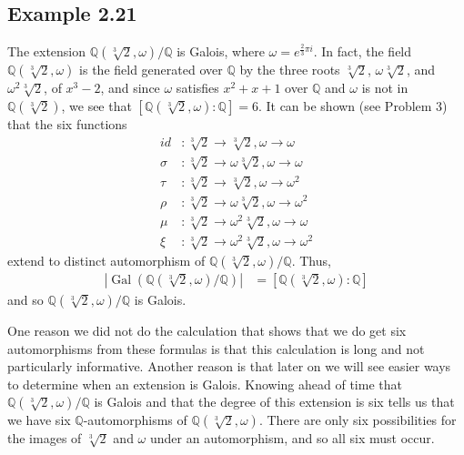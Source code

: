 \documentclass[fleqn]{article}
\DeclareMathOperator{\Gal}{Gal}
\begin{document}
        \subsection{Example 2.21}
        The extension $\mathbb{Q}\left(\sqrt[3]{2}, \omega\right)/\mathbb{Q}$ is Galois, where $\omega = e^{\frac{2}{3} \pi i}$.  In fact, the field $\mathbb{Q}\left(\sqrt[3]{2}, \omega\right)$ is the field generated over $\mathbb{Q}$ by the three roots $\sqrt[3]{2}$, $\omega \sqrt[3]{2}$, and $\omega^2 \sqrt[3]{2}$, of $x^3 - 2$, and since $\omega$ satisfies $x^2 + x + 1$ over $\mathbb{Q}$ and $\omega$ is not in $\mathbb{Q}\left(\sqrt[3]{2}\right)$, we see that $\left[\mathbb{Q}\left(\sqrt[3]{2}, \omega\right) : \mathbb{Q}\right] = 6$.  It can be shown (see Problem 3) that the six functions
        \begin{align}
            id &: \sqrt[3]{2} \to \sqrt[3]{2}, \omega \to \omega \\
            \sigma &: \sqrt[3]{2} \to \omega \sqrt[3]{2}, \omega \to \omega \\
            \tau &: \sqrt[3]{2} \to \sqrt[3]{2}, \omega \to \omega^2 \\
            \rho &: \sqrt[3]{2} \to \omega \sqrt[3]{2}, \omega \to \omega^2 \\
            \mu &: \sqrt[3]{2} \to \omega^2 \sqrt[3]{2}, \omega \to \omega \\
            \xi &: \sqrt[3]{2} \to \omega^2 \sqrt[3]{2}, \omega \to \omega^2
        \end{align}
        extend to distinct automorphism of $\mathbb{Q}\left(\sqrt[3]{2}, \omega\right)/\mathbb{Q}$.  Thus, 
        \begin{align}
            \left|\Gal\left(\mathbb{Q}\left(\sqrt[3]{2}, \omega\right)/\mathbb{Q}\right)\right| &= \left[\mathbb{Q}\left(\sqrt[3]{2}, \omega\right) : \mathbb{Q}\right]
        \end{align}
        and so $\mathbb{Q}\left(\sqrt[3]{2}, \omega\right)/\mathbb{Q}$ is Galois.
        
        One reason we did not do the calculation that shows that we do get six automorphisms from these formulas is that this calculation is long and not particularly informative.  Another reason is that later on we will see easier ways to determine when an extension is Galois.  Knowing ahead of time that $\mathbb{Q}\left(\sqrt[3]{2}, \omega\right)/\mathbb{Q}$ is Galois and that the degree of this extension is six tells us that we have six $\mathbb{Q}$-automorphisms of $\mathbb{Q}\left(\sqrt[3]{2}, \omega\right)$.  There are only six possibilities for the images of $\sqrt[3]{2}$ and $\omega$ under an automorphism, and so all six must occur.
        
\end{document}
